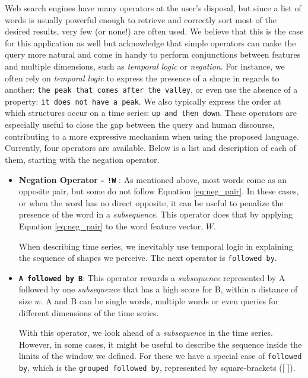 {Web search engines have many operators at the user’s disposal, but since a list of words is usually powerful enough to retrieve and correctly sort most of the desired results, very few (or none!) are often used. We believe that this is the case for this application as well but acknowledge that simple operators can make the query more natural and come in handy to perform conjunctions between features and multiple dimensions, such as \textit{temporal logic} or \textit{negation}. For instance, we often rely on \textit{temporal logic} to express the presence of a shape in regards to another: \texttt{the peak that comes after the valley}, or even use the absence of a property: \texttt{it does not have a peak}. We also typically express the order at which structures occur on a time series: \texttt{up and then down}. These operators are especially useful to close the gap between the query and human discourse, contributing to a more expressive mechanism when using the proposed language. Currently, four operators are available. Below is a list and description of each of them, starting with the negation operator.
\par
\begin{itemize}

\item \textbf{Negation Operator  - \texttt{!W}} : As mentioned above, most words come as an opposite pair, but some do not follow Equation \ref{eq:neg_pair}. In these cases, or when the word has no direct opposite, it can be useful to penalize the presence of the word in a \textit{subsequence}. This operator does that by applying Equation \ref{eq:neg_pair} to the word feature vector, $W$. 

When describing time series, we inevitably use temporal logic in explaining the sequence of shapes we perceive. The next operator is \texttt{followed by}.
 
\item \textbf{\texttt{A followed by B}}: This operator rewards a \textit{subsequence} represented by A followed by one \textit{subsequence} that has a high score for B, within a distance of size $w$. A and B can be single words, multiple words or even queries for different dimensions of the time series.

With this operator, we look ahead of a \textit{subsequence} in the time series. However, in some cases, it might be useful to describe the sequence inside the limits of the window we defined. For these we have a special case of \texttt{followed by}, which is the \texttt{grouped followed by}, represented by square-brackets ([ ]). 


\end{itemize}}
